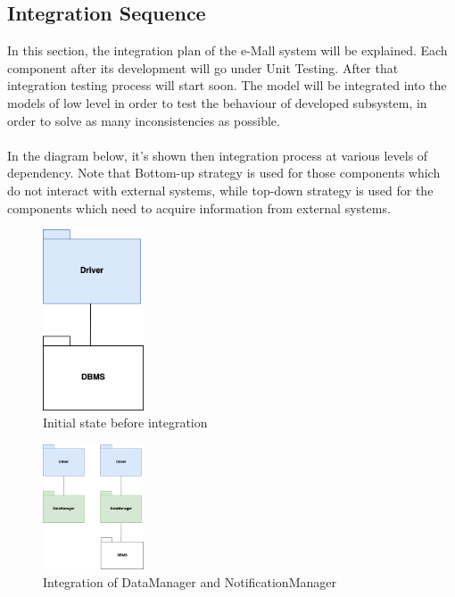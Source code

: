 \documentclass[../main.tex]{subfiles}
\begin{document}
\subsection{Integration Sequence}

In this section, the integration plan of the e-Mall system will be explained. Each component after its development will go under Unit Testing. After that integration testing process will start soon. The model will be integrated into the models of low level in order to test the behaviour of developed subsystem, in order to solve as many inconsistencies as possible.
\\
\\
In the diagram below, it’s shown then integration process at various levels of dependency. Note that Bottom-up strategy is used for those components which do not interact with external systems, while top-down strategy is used for the components which need to acquire information from external systems. 

\begin{figure}[H]
    \centering
    \begin{minipage}[b]{\textwidth}
        \centering
        \includegraphics[width=30mm]{ImplementationDiagram/1.png}
        \caption{Initial state before integration}
        \label{fig:impdiag}
    \end{minipage}
\end{figure}

\begin{figure}[H]
    \centering
    \begin{minipage}[b]{\textwidth}
    \centering
    \includegraphics[width=30mm]{ImplementationDiagram/2.png}
    \caption{Integration of DataManager and NotificationManager}
    \label{fig:impdiag}
    \end{minipage}
\end{figure}
\end{document}
